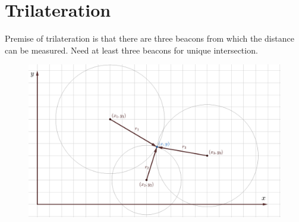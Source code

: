 \documentclass[10pt,letterpaper]{article}
\author{}
\begin{document}
\maketitle

\setcounter{tocdepth}{4}











\section{Trilateration}

Premise of trilateration is that there are three beacons from which the distance can be measured. Need at least three beacons for unique intersection.

\begin{figure}[H]
\centering
\includegraphics[width=.6\textwidth]{trilateration.png}
\end{figure}
\end{document}
